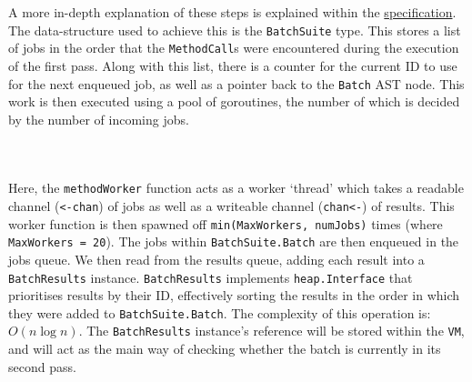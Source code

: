 A more in-depth explanation of these steps is explained within the \hyperref[sec:batching]{specification}. The data-structure used to achieve this is the \verb|BatchSuite| type. This stores a list of jobs in the order that the \verb|MethodCall|s were encountered during the execution of the first pass. Along with this list, there is a counter for the current ID to use for the next enqueued job, as well as a pointer back to the \verb|Batch| AST node. This work is then executed using a pool of goroutines, the number of which is decided by the number of incoming jobs.

\inputminted[firstline=72, lastline=78, autogobble, breaklines, tabsize=4]{go}{../../src/batch.go}

\inputminted[firstline=89, lastline=102, autogobble, breaklines, tabsize=4]{go}{../../src/batch.go}

\inputminted[firstline=124, lastline=160, autogobble, breaklines, tabsize=4]{go}{../../src/batch.go}

Here, the \verb|methodWorker| function acts as a worker `thread' which takes a readable channel (\texttt{<-chan}) of jobs as well as a writeable channel (\texttt{chan<-}) of results. This worker function is then spawned off \verb|min(MaxWorkers, numJobs)| times (where \verb|MaxWorkers = 20|). The jobs within \verb|BatchSuite.Batch| are then enqueued in the jobs queue. We then read from the results queue, adding each result into a \verb|BatchResults| instance. \verb|BatchResults| implements \verb|heap.Interface| that prioritises results by their ID, effectively sorting the results in the order in which they were added to \verb|BatchSuite.Batch|. The complexity of this operation is: $O(n \log n)$. The \verb|BatchResults| instance's reference will be stored within the \verb|VM|, and will act as the main way of checking whether the batch is currently in its second pass.

